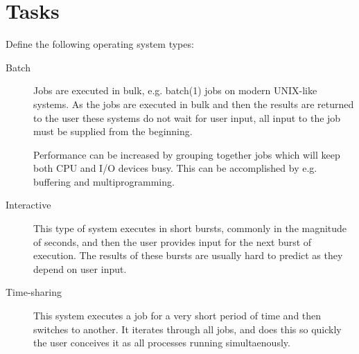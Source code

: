 \documentclass[a4paper,nocourse]{miunasgn}
\begin{document}
\section{Tasks}
\label{sec:Work}
\begin{questions}
	\question\label{q:ostypes}
	Define the following operating system types:
	\begin{solution}
		\begin{description}
			\item[Batch] Jobs are executed in bulk, e.g. batch(1) jobs on modern 
				UNIX-like systems.
				As the jobs are executed in bulk and then the results are returned to 
				the user these systems do not wait for user input, all input to the job 
				must be supplied from the beginning.

				Performance can be increased by grouping together jobs which will keep 
				both CPU and I/O devices busy.
				This can be accomplished by e.g. buffering and multiprogramming.

			\item[Interactive] This type of system executes in short bursts, commonly 
				in the magnitude of seconds, and then the user provides input for the 
				next burst of execution.
				The results of these bursts are usually hard to predict as they depend 
				on user input.
				
			\item[Time-sharing] This system executes a job for a very short period of 
				time and then switches to another.
				It iterates through all jobs, and does this so quickly the user 
				conceives it as all processes running simultaenously.


\end{description}
\end{solution}
\end{questions}
\end{document}

